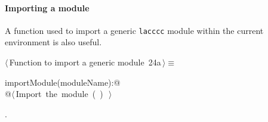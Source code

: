 \documentclass[11pt,oneside]{article}	%
\begin{document}
\paragraph{Importing a module} A function used to import a generic \texttt{lacccc} module within the current environment is also useful.
\begin{flushleft} \small
\begin{minipage}{\linewidth} \label{scrap41}
\protect{}$\langle\,$Function to import a generic module\nobreak\ {\footnotesize 24a}$\,\rangle\equiv$
\vspace{-1ex}
\begin{list}{}{} \item
\mbox{}\verb@def importModule(moduleName):@\\
\mbox{}\verb@   @\hbox{$\langle\,$Import the module\nobreak\ ({\footnotesize {}\label{scrap42}
 }\mbox{}\verb@moduleName@ ) {\footnotesize {}}$\,\rangle$}\verb@@\\
\mbox{}\verb@@{\NWsep}
\end{list}
\vspace{-1ex}
\footnotesize\addtolength{\baselineskip}{-1ex}
\begin{list}{}{\setlength{\itemsep}{-\parsep}\setlength{\itemindent}{-\leftmargin}}
\item {\NWtxtMacroNoRef}.
\end{list}
\end{minipage}\\[4ex]
\end{flushleft}






\end{document}
